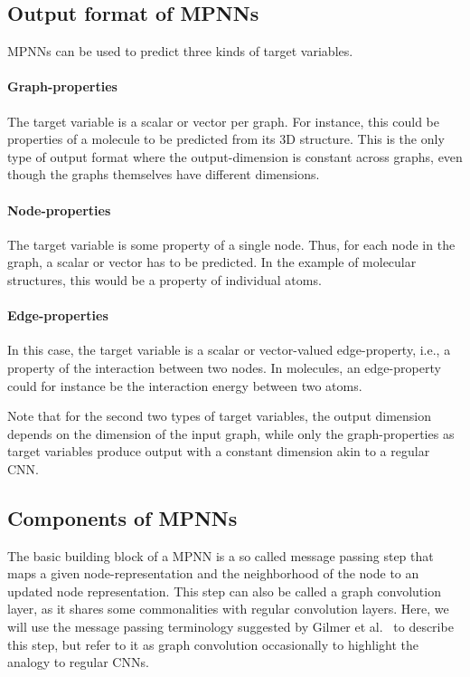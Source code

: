 \subsection{Output format of MPNNs}
\label{sec:graph-output}

MPNNs can be used to predict three kinds of target variables.

\paragraph{Graph-properties}
\noindent The target variable is a scalar or vector per graph. For instance, this could be properties of a molecule to be predicted from its 3D structure. This is the only type of output format where the output-dimension is constant across graphs, even though the graphs themselves have different dimensions.
\paragraph{Node-properties}
\noindent The target variable is some property of a single node. Thus, for each node in the graph, a scalar or vector has to be predicted. In the example of molecular structures, this would be a property of individual atoms.
\paragraph{Edge-properties}
\noindent In this case, the target variable is a scalar or vector-valued edge-property, i.e., a property of the interaction between two nodes. In molecules, an edge-property could for instance be the interaction energy between two atoms.

Note that for the second two types of target variables, the output dimension depends on the dimension of the input graph, while only the graph-properties as target variables produce output with a constant dimension akin to a regular CNN.

\subsection{Components of MPNNs}


The basic building block of a MPNN is a so called message passing step that maps a given node-representation and the neighborhood of the node to an updated node representation. This step can also be called a graph convolution layer, as it shares some commonalities with regular convolution layers. Here, we will use the message passing terminology suggested by Gilmer et al.~\cite{Gilmer2017} to describe this step, but refer to it as graph convolution occasionally to highlight the analogy to regular CNNs.

